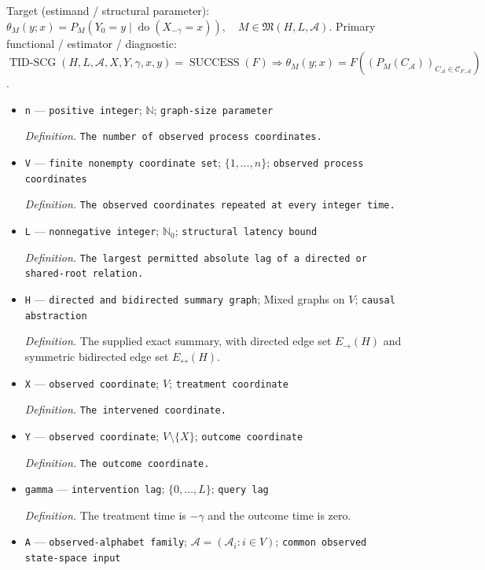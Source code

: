 \documentclass{article}
\begin{document}
Target (estimand / structural parameter): \(\theta_M(y;x)=P_M(Y_0=y\mid\operatorname{do}(X_{-\gamma}=x)),\quad M\in\mathfrak M(H,L,\mathcal A)\).
Primary functional / estimator / diagnostic: \(\operatorname{TID\text{-}SCG}(H,L,\mathcal A,X,Y,\gamma,x,y)=\operatorname{SUCCESS}(F)\Rightarrow\theta_M(y;x)=F((P_M(C_{\mathcal A}))_{C_{\mathcal A}\in\mathcal C_{F,\mathcal A}})\).
\begin{itemize}
  \item \texttt{n} --- \texttt{positive integer}; \(\mathbb N\); \texttt{graph-\allowbreak{}size parameter}
  \par\smallskip\noindent\emph{Definition.} \texttt{The number of observed process coordinates.}
  \item \texttt{V} --- \texttt{finite nonempty coordinate set}; \(\{1,\ldots,n\}\); \texttt{observed process coordinates}
  \par\smallskip\noindent\emph{Definition.} \texttt{The observed coordinates repeated at every integer time.}
  \item \texttt{L} --- \texttt{nonnegative integer}; \(\mathbb N_0\); \texttt{structural latency bound}
  \par\smallskip\noindent\emph{Definition.} \texttt{The largest permitted absolute lag of a directed or shared-\allowbreak{}root relation.}
  \item \texttt{H} --- \texttt{directed and bidirected summary graph}; Mixed graphs on \(V\); \texttt{causal abstraction}
  \par\smallskip\noindent\emph{Definition.} The supplied exact summary, with directed edge set \(E_{\to}(H)\) and symmetric bidirected edge set \(E_{\leftrightarrow}(H)\).
  \item \texttt{X} --- \texttt{observed coordinate}; \(V\); \texttt{treatment coordinate}
  \par\smallskip\noindent\emph{Definition.} \texttt{The intervened coordinate.}
  \item \texttt{Y} --- \texttt{observed coordinate}; \(V\setminus\{X\}\); \texttt{outcome coordinate}
  \par\smallskip\noindent\emph{Definition.} \texttt{The outcome coordinate.}
  \item \texttt{gamma} --- \texttt{intervention lag}; \(\{0,\ldots,L\}\); \texttt{query lag}
  \par\smallskip\noindent\emph{Definition.} The treatment time is \(-\gamma\) and the outcome time is zero.
  \item \texttt{A} --- \texttt{observed-\allowbreak{}alphabet family}; \(\mathcal A=(\mathcal A_i:i\in V)\); \texttt{common observed state-\allowbreak{}space input}

\end{itemize}
\end{document}
